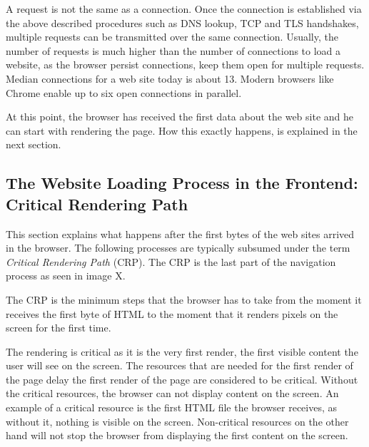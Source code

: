 A request is not the same as a connection.
Once the connection is established via the above described procedures such as DNS lookup, TCP and TLS handshakes, multiple requests can be transmitted over the same connection.
Usually, the number of requests is much higher than the number of connections to load a website, as the browser persist connections, keep them open for multiple requests.
Median connections for a web site today is about 13. %
Modern browsers like Chrome enable up to six open connections in parallel. %




At this point, the browser has received the first data about the web site and he can start with rendering the page.
How this exactly happens, is explained in the next section.







\subsection{The Website Loading Process in the Frontend: Critical Rendering Path}

This section explains what happens after the first bytes of the web sites arrived in the browser.
The following processes are typically subsumed under the term \textit{Critical Rendering Path} (CRP).
The CRP is the last part of the navigation process as seen in image X.



The CRP is the minimum steps that the browser has to take from the moment it receives the first byte of HTML to the moment that it renders pixels on the screen for the first time.

The rendering is critical as it is the very first render, the first visible content the user will see on the screen.
The resources that are needed for the first render of the page delay the first render of the page are considered to be critical.
Without the critical resources, the browser can not display content on the screen.
An example of a critical resource is the first HTML file the browser receives, as without it, nothing is visible on the screen.
Non-critical resources on the other hand will not stop the browser from displaying the first content on the screen. %


